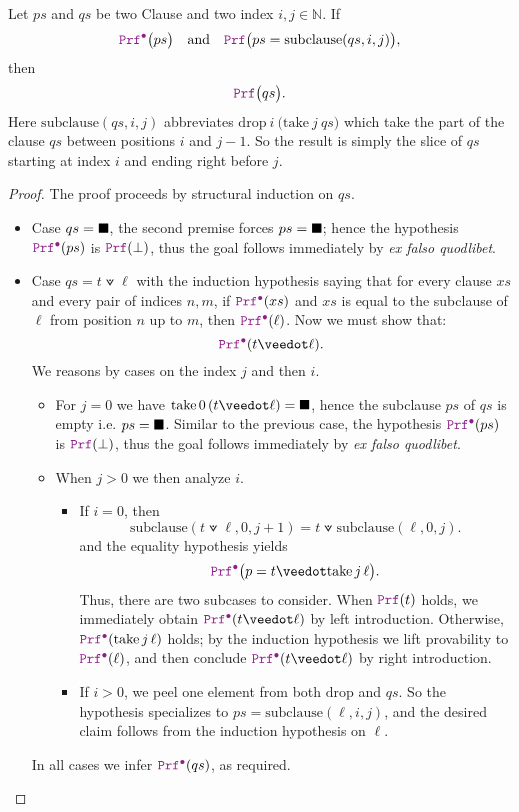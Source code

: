 \begin{lemma}\label{lem:orN_subList}
Let $ps$ and $qs$ be two Clause and two index $i,j \in \mathbb{N}$. If
\[
\prfcl\bigl(ps\bigr)
\quad\text{and}\quad
\prf\bigl(ps = \mathrm{subclause}(qs,i,j)\bigr),
\]
then
\[
\prf\bigl(qs\bigr).
\]
Here $\mathrm{subclause}(qs,i,j)$ abbreviates $\mathrm{drop}~i~\bigl(\mathrm{take}~j~qs\bigr)$ which take the part of the clause $qs$ between positions $i$ and $j-1$.
So the result is simply the slice of $qs$ starting at index  $i$ and ending right before $j$.
\begin{proof}
The proof proceeds by structural induction on $qs$.
\begin{itemize}
  \item[] Case $qs=\blacksquare$, the second premise forces $ps=\blacksquare$; hence the hypothesis $\prfcl(ps)$ is $\prf(\bot)$, thus the goal follows immediately by \emph{ex falso quodlibet}.
  \item[] Case $qs=t \veedot \ell$ with the induction hypothesis saying that for every clause $xs$ and every pair of indices $n,m$, if $\prfcl(xs)$ and $xs$ is equal to the subclause of $\ell$ from position $n$ up to $m$, then $\prfcl(\ell)$.
    Now we must show that:
    \[
        \prfcl (t \veedot \ell).
    \]
    We reasons by cases on the index $j$ and then $i$.
    \begin{itemize}
      \item For $j=0$ we have $\mathrm{take}\,0\,(t \veedot \ell)=\nil$, hence the subclause $ps$ of $qs$ is empty i.e. $ps = \blacksquare$.
      Similar to the previous case, the hypothesis $\prfcl(ps)$ is $\prf(\bot)$, thus the goal follows immediately by \emph{ex falso quodlibet}.

      \item When $j > 0$ we then analyze $i$.
        \begin{itemize}
          \item If $i=0$, then
            \[
              \mathrm{subclause}(t \veedot \ell,0,j{+}1)= t \veedot \mathrm{subclause}(\ell,0,j).
            \]
            and the equality hypothesis yields
            \[
              \prfcl\bigl(p = t \veedot \mathrm{take}\,j\,\ell\bigr).
            \]
            Thus, there are two subcases to consider.
            When $\prf(t)$ holds, we immediately obtain $\prfcl(t \veedot \ell)$ by left introduction.
            Otherwise, $\prfcl(\mathrm{take}\,j\,\ell)$ holds; by the induction hypothesis we lift provability to $\prfcl(\ell)$, and then conclude $\prfcl(t \veedot \ell)$ by right introduction.
          \item If $i > 0$, we peel one element from both $\mathrm{drop}$ and $qs$.
            So the hypothesis specializes to $ps=\mathrm{subclause}(\ell,i,j)$, and the desired claim follows from the induction hypothesis on $\ell$.
          \end{itemize}
    \end{itemize}
  In all cases we infer $\prfcl(qs)$, as required.
\end{itemize}
\end{proof}
\end{lemma}


